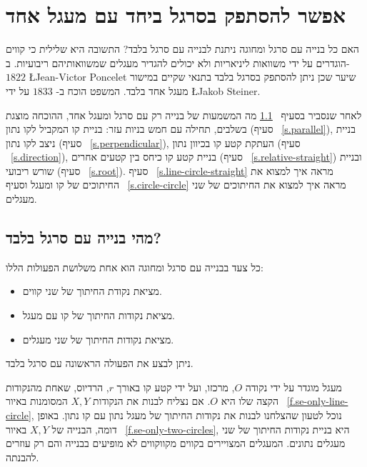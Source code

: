 
\chapter{אפשר להסתפק בסרגל ביחד עם מעגל אחד}\label{c.straightedge}


האם כל בנייה עם סרגל ומחוגה ניתנת לבנייה עם סרגל בלבד? התשובה היא שלילית כי קווים הוגדרים על ידי משוואות ליניאריות ולא יכולים להגדיר מעגלים שמשוואותיהם ריבועיות. ב-%
$1822$
\L{Jean-Victor Poncelet}
שיער שכן ניתן להסתפק בסרגל בלבד בתנאי שקיים במישור מעגל אחד בלבד. המשפט הוכח ב-%
$1833$
על ידי
\L{Jakob Steiner}.

לאחר שנסביר בסעיף%
~\ref{s.se-what}
מה המשמעות של בנייה רק עם סרגל ומעגל אחד, ההוכחה מוצגת בשלבים, תחילה עם חמש בניות עזר: בניית קו המקביל לקו נתון (סעיף%
~\ref{s.parallel}),
בניית ניצב לקו נתון (סעיף%
~\ref{s.perpendicular}),
העתקת קטע קו בכיוון נתון (סעיף%
~\ref{s.direction}), 
בניית קטע קו כיחס בין קטעים אחרים (סעיף%
~\ref{s.relative-straight})
ובניית שורש ריבועי (סעיף%
~\ref{s.root}).
סעיף%
~\ref{s.line-circle-straight}
מראה איך למצוא את החיתוכים של קו ומעגל וסעיף%
~\ref{s.circle-circle}
מראה איך למצוא את החיתוכים של שני מעגלים.


\section{מהי בנייה עם סרגל בלבד?}\label{s.se-what}

כל צעד בבנייה עם סרגל ומחוגה הוא אחת משלושת הפעולות הללו:
\begin{itemize}
\setlength{\itemsep}{0pt}
\item
מציאת נקודת החיתוך של שני קווים.
\item
מציאת נקודות החיתוך של קו עם מעגל.
\item
מציאת נקודות החיתוך של שני מעגלים.
\end{itemize}
ניתן לבצע את הפעולה הראשונה עם סרגל בלבד.

מעגל מוגדר על ידי נקודה
$O$,
מרכזו, ועל ידי קטע קו באורך
$r$,
הרדיוס, שאחת מהנקודות הקצה שלו היא
$O$.
אם נצליח לבנות את הנקודות
$X,Y$
המסומנות באיור%
~\ref{f.se-only-line-circle},
נוכל לטעון שהצלחנו לבנות את נקודות החיתוך של מעגל נתון עם קו נתון. באופן דומה, הבנייה של
$X,Y$
באיור%
~\ref{f.se-only-two-circles},
היא בניית נקודות החיתוך של שני מעגלים נתונים. המעגלים המצויירים בקווים מקווקווים לא מופיעים בבנייה והם רק עוזרים להבנתה.

